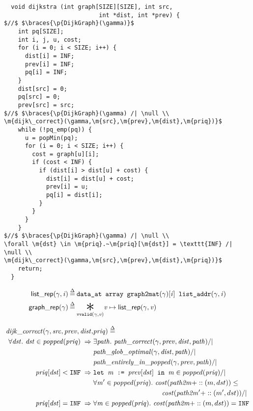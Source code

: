 
\begin{lstlisting}
  void dijkstra (int graph[SIZE][SIZE], int src, 
                           int *dist, int *prev) {
$//$ $\braces{\p{DijkGraph}(\gamma)}$
    int pq[SIZE];
    int i, j, u, cost;
    for (i = 0; i < SIZE; i++) {
      dist[i] = INF; 
      prev[i] = INF; 
      pq[i] = INF;
    }
    dist[src] = 0; 
    pq[src] = 0; 
    prev[src] = src;
$//$ $\braces{\p{DijkGraph}(\gamma) /| \null \\
\m{dijk\_correct}(\gamma,\m{src},\m{prev},\m{dist},\m{priq})}$
    while (!pq_emp(pq)) {
      u = popMin(pq);
      for (i = 0; i < SIZE; i++) {
        cost = graph[u][i]; 
        if (cost < INF) {
          if (dist[i] > dist[u] + cost) {
            dist[i] = dist[u] + cost;
            prev[i] = u; 
            pq[i] = dist[i];
          }
        }  
      }
    }
$//$ $\braces{\p{DijkGraph}(\gamma) /| \null \\ 
\forall \m{dst} \in \m{priq}.~\m{priq}[\m{dst}] = \texttt{INF} /| \null \\ 
\m{dijk\_correct}(\gamma,\m{src},\m{prev},\m{dist},\m{priq})}$
    return;
  }
\end{lstlisting}
\vspace{0.5em}
\begin{equation*}
\begin{split}
\p{list\_rep}(\gamma, \m{i}) &\defeq \texttt{data\_at  array  graph2mat}(\gamma)[\m{i}] \texttt{  list\_addr}(\gamma, \m{i}) \\
\vspace{1em}
\p{graph\_rep}(\gamma) &\defeq \underset{\texttt{vvalid}(\gamma,\m{v})}{\bigstar} \m{v}  \mapsto\p{list\_rep}(\gamma, \m{v})
\end{split}
\end{equation*}

\begin{equation*}
\begin{split}
\m{dijk\_correct}(\gamma, \m{src}, \m{prev}, \m{dist},& \m{priq}) \; \defeq \; \\
\forall \m{dst}.~\m{dst} \in \m{popped}(\m{priq}) \; => \; & \exists \m{path}.~\m{path\_correct}(\gamma, \m{prev}, \m{dist}, \m{path}) /| \null \\
& \m{path\_glob\_optimal}(\gamma, \m{dist}, \m{path}) /| \null \\
& \m{path\_entirely\_in\_popped}(\gamma, \m{prev}, \m{path}) /| \null \\
\m{priq}[\m{dst}] < \ifty \; => \; & \texttt{let }\m{m} \texttt{ := } \m{prev}[\m{dst}] \texttt{ in } \m{m} \in \m{popped}(\m{priq}) /| \null \\
&\forall \m{m'} \in \m{popped}(\m{priq}).~\m{cost}(\m{path2m} +:: (m, dst)) \le \null \\
&\hspace{10em} \m{cost}(\m{path2m'} +:: (m', dst)) /| \null \\
\m{priq}[\m{dst}] = \ifty \; => \; & \forall \m{m} \in \m{popped}(\m{priq}).~\m{cost}(\m{path2m} +:: (m, dst)) = \ifty
\end{split}
\end{equation*}

